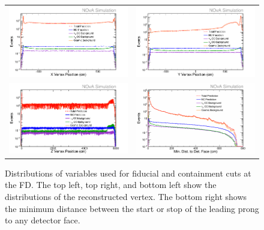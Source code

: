 \begin{figure}[htb]
  \centering
  \begin{tabular}{c c}
    \includegraphics[width=.47\textwidth]{figures/NP1VtxX.png} &
    \includegraphics[width=.47\textwidth]{figures/NP1VtxY.png} \\
    \includegraphics[width=.47\textwidth]{figures/NP1VtxZ.png} &
    \includegraphics[width=.47\textwidth]{figures/NP1Cont.png} \\
  \end{tabular}
  \caption[Fiducial and Containment Variable Distributions]{Distributions of variables used for fiducial and containment cuts at the FD. The top left, top right, and bottom left show the distributions of the reconstructed vertex. The bottom right shows the minimum distance between the start or stop of the leading prong to any detector face.}
  \label{fig:FidCont}
\end{figure}


